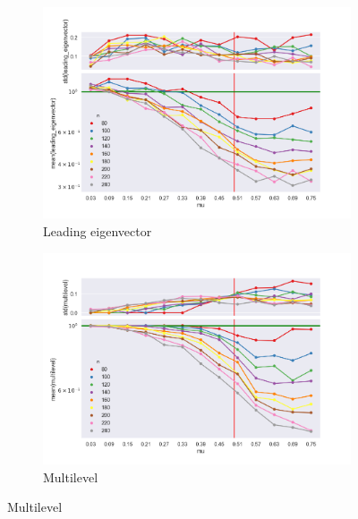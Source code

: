 \begin{figure}
    \begin{subfigure}[b]{0.32\textwidth}
        \includegraphics[width=\textwidth]{fig/ratio_vs_mu_leading_eigenvector}
        \caption{Leading eigenvector}
        \label{fig:tiger}
    \end{subfigure}
    \qquad
    \begin{subfigure}[b]{0.32\textwidth}
        \includegraphics[width=\textwidth]{fig/ratio_vs_mu_multilevel}
        \caption{Multilevel}
        \label{fig:mouse}
    \end{subfigure}


\end{figure}
